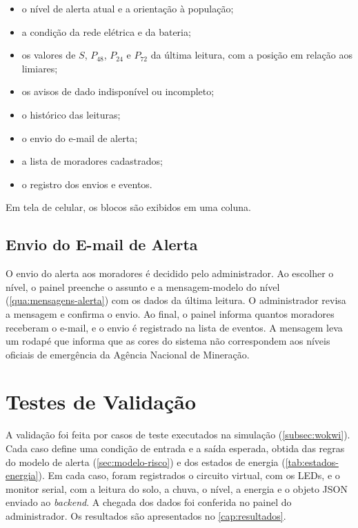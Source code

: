\begin{itemize}
  \item o nível de alerta atual e a orientação à população;
  \item a condição da rede elétrica e da bateria;
  \item os valores de $S$, $P_{48}$, $P_{24}$ e $P_{72}$ da última
  leitura, com a posição em relação aos limiares;
  \item os avisos de dado indisponível ou incompleto;
  \item o histórico das leituras;
  \item o envio do e-mail de alerta;
  \item a lista de moradores cadastrados;
  \item o registro dos envios e eventos.
\end{itemize}

Em tela de celular, os blocos são exibidos em uma coluna.

\subsection{Envio do E-mail de Alerta}
\label{subsec:envio}

O envio do alerta aos moradores é decidido pelo administrador. Ao
escolher o nível, o painel preenche o assunto e a mensagem-modelo do
nível (\autoref{qua:mensagens-alerta}) com os dados da última leitura.
O administrador revisa a mensagem e confirma o envio. Ao final, o painel
informa quantos moradores receberam o e-mail, e o envio é registrado na
lista de eventos.
A mensagem leva um rodapé que informa que as cores do sistema não
correspondem aos níveis oficiais de emergência da Agência Nacional de
Mineração.

\section{Testes de Validação}
\label{sec:testes-validacao}

A validação foi feita por casos de teste executados na simulação
(\autoref{subsec:wokwi}). Cada caso define uma condição de entrada e a
saída esperada, obtida das regras do modelo de alerta
(\autoref{sec:modelo-risco}) e dos estados de energia
(\autoref{tab:estados-energia}).
Em cada caso, foram registrados o circuito virtual, com os LEDs, e o
monitor serial, com a leitura do solo, a chuva, o nível, a energia e o
objeto JSON enviado ao \textit{backend}. A chegada dos dados foi conferida
no painel do administrador. Os resultados são apresentados no
\autoref{cap:resultados}.

